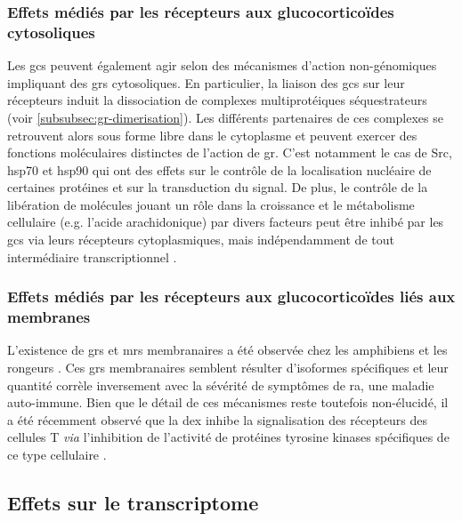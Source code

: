 \documentclass[../main.tex]{subfiles}
\begin{document}
\subsubsection{Effets médiés par les récepteurs aux glucocorticoïdes cytosoliques}
Les \glspl{gc} peuvent également agir selon des mécanismes d'action non-génomiques impliquant des \glspl{gr} cytosoliques.
En particulier, la liaison des \glspl{gc} sur leur récepteurs induit la dissociation de complexes multiprotéiques séquestrateurs (voir \autoref{subsubsec:gr-dimerisation}).
Les différents partenaires de ces complexes se retrouvent alors sous forme libre dans le cytoplasme et peuvent exercer des fonctions moléculaires distinctes de l'action de \gls{gr}.
C'est notamment le cas de \gls{Src}, \gls{hsp70} et \gls{hsp90} \citep{Croxtall2000,Marchetti2003,Tumlin1997} qui ont des effets sur le contrôle de la localisation nucléaire de certaines protéines et sur la transduction du signal.
De plus, le contrôle de la libération de molécules jouant un rôle dans la croissance et le métabolisme cellulaire (e.g. l'acide arachidonique) par divers facteurs peut être inhibé par les \glspl{gc} via leurs récepteurs cytoplasmiques, mais indépendamment de tout intermédiaire transcriptionnel \citep{Croxtall2000}.

\subsubsection{Effets médiés par les récepteurs aux glucocorticoïdes liés aux membranes}
L'existence de \glspl{gr} et \glspl{mr} membranaires a été observée chez les amphibiens et les rongeurs \citep{Orchinik1991,Gametchu1999}.
Ces \glspl{gr} membranaires semblent résulter d'isoformes spécifiques \citep{Bartholome2004} et leur quantité corrèle inversement avec la sévérité de symptômes de \gls{ra}, une maladie auto-immune.
Bien que le détail de ces mécanismes reste toutefois non-élucidé, il a été récemment observé que la \gls{dex} inhibe la signalisation des récepteurs des cellules T \textit{via} l'inhibition de l'activité de protéines tyrosine kinases spécifiques de ce type cellulaire \citep{Lowenberg2006}.


\subsection{Effets sur le transcriptome}
\end{document}

